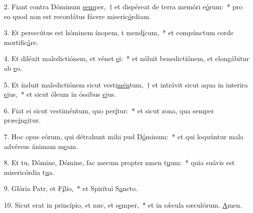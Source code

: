 2. Fiant contra Dóminum \uline{sem}per,~† et dispéreat de terra memóri e\uline{ó}rum:~* pro eo quod non est recordátus fácere miseric\uline{ó}rdiam.\par 
3. Et persecútus est hóminem ínopem, t mend\uline{í}cum,~* et compúnctum corde mortific\uline{á}re.\par 
4. Et diléxit maledictiónem, et vénet \uline{e}i:~* et nóluit benedictiónem, et elongábitur ab \uline{e}o.\par 
5. Et índuit maledictiónem sicut vesti\uline{mén}tum,~† et intrávit sicut aqua in interira \uline{e}jus,~* et sicut óleum in óssibus \uline{e}jus.\par 
6. Fiat ei sicut vestiméntum, quo per\uline{í}tur:~* et sicut zona, qua semper præc\uline{í}ngitur.\par 
7. Hoc opus eórum, qui détrahunt mihi pud D\uline{ó}minum:~* et qui loquúntur mala advérsus ánimam m\uline{e}am.\par 
8. Et tu, Dómine, Dómine, fac mecum propter nmen t\uline{u}um:~* quia suávis est misericórdia t\uline{u}a.\par 
9. Glória Patr, et F\uline{í}lio,~* et Spirítui S\uline{a}ncto.\par 
10. Sicut erat in princípio, et nnc, et s\uline{e}mper,~* et in sǽcula sæculórum. \uline{A}men.\par 
